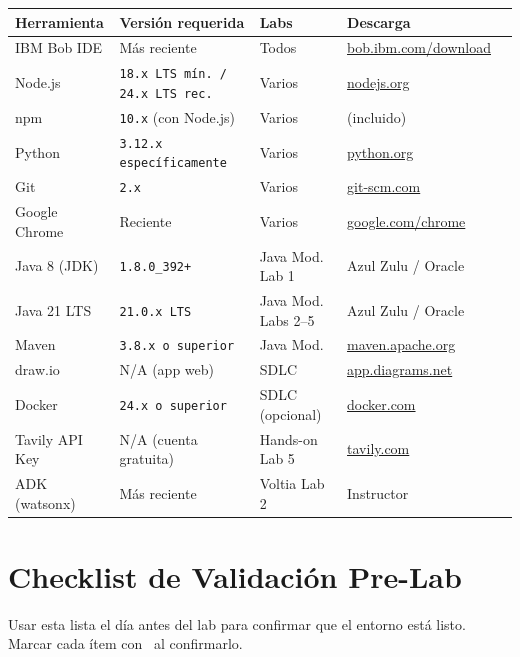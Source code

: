 \documentclass[11pt, a4paper]{article}
\newcommand{\version}[1]{\texttt{\textcolor{ibmblue}{#1}}}
\newcommand{\checkmark}{\textcolor{ibmgreen}{\faCheckCircle}}
\begin{document}
\begin{center}
\begin{tabular}{@{}lllll@{}}
\toprule
\textbf{Herramienta} & \textbf{Versión requerida} & \textbf{Labs} & \textbf{Descarga} \\
\midrule
IBM Bob IDE & Más reciente & Todos & \url{bob.ibm.com/download} \\
Node.js & \version{18.x LTS mín. / 24.x LTS rec.} & Varios & \url{nodejs.org} \\
npm & \version{10.x} (con Node.js) & Varios & (incluido) \\
Python & \version{3.12.x específicamente} & Varios & \url{python.org} \\
Git & \version{2.x} & Varios & \url{git-scm.com} \\
Google Chrome & Reciente & Varios & \url{google.com/chrome} \\
Java 8 (JDK) & \version{1.8.0\_392+} & Java Mod. Lab 1 & Azul Zulu / Oracle \\
Java 21 LTS & \version{21.0.x LTS} & Java Mod. Labs 2–5 & Azul Zulu / Oracle \\
Maven & \version{3.8.x o superior} & Java Mod. & \url{maven.apache.org} \\
draw.io & N/A (app web) & SDLC & \url{app.diagrams.net} \\
Docker & \version{24.x o superior} & SDLC (opcional) & \url{docker.com} \\
Tavily API Key & N/A (cuenta gratuita) & Hands-on Lab 5 & \url{tavily.com} \\
ADK (watsonx) & Más reciente & Voltia Lab 2 & Instructor \\
\bottomrule
\end{tabular}
\end{center}

\section{Checklist de Validación Pre-Lab}
\label{sec:checklist}

Usar esta lista el día antes del lab para confirmar que el entorno está listo. Marcar cada ítem con \checkmark\ al confirmarlo.
\end{document}
